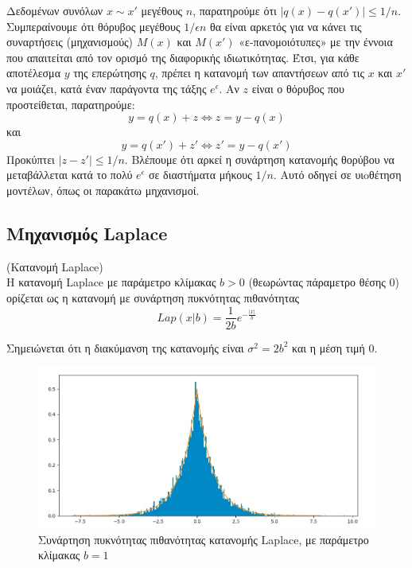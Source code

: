 Δεδομένων συνόλων $x\sim x'$ μεγέθους $n$, παρατηρούμε ότι $|q(x)-q(x')|\leq 1/n$. Συμπεραίνουμε ότι θόρυβος μεγέθους $1/\epsilon n$ θα είναι αρκετός για να κάνει τις συναρτήσεις (μηχανισμούς) $M(x)$ και $M(x')$ «ε-πανομοιότυπες» με την έννοια που απαιτείται από τον ορισμό της διαφορικής ιδιωτικότητας. Έτσι, για κάθε αποτέλεσμα $y$ της επερώτησης $q$, πρέπει η κατανομή των απαντήσεων από τις $x$ και $x'$ να μοιάζει, κατά έναν παράγοντα της τάξης $e^\epsilon$. Αν $z$ είναι ο θόρυβος που προστείθεται, παρατηρούμε:
$$y=q(x)+z \Longleftrightarrow z=y-q(x)$$ και
$$y=q(x')+z' \Longleftrightarrow z'=y-q(x')$$
Προκύπτει $|z-z'|\leq 1/n$. Βλέπουμε ότι αρκεί η συνάρτηση κατανομής θορύβου να μεταβάλλεται κατά το πολύ $e^\epsilon$ σε διαστήματα μήκους $1/n$. Αυτό οδηγεί σε υιoθέτηση μοντέλων, όπως οι παρακάτω μηχανισμοί.


\subsection{Μηχανισμός \textlatin{Laplace}}
\begin{definition}(Κατανομή \textlatin{Laplace})\\
H κατανομή \textlatin{Laplace} με παράμετρο κλίμακας $b>0$ (θεωρώντας πάραμετρο θέσης 0) ορίζεται ως η κατανομή με συνάρτηση πυκνότητας πιθανότητας 
$$Lap(x|b)=\frac{1}{2b}e^{-\frac{|x|}{b}}$$
\end{definition}
Σημειώνεται ότι η διακύμανση της κατανομής είναι $\sigma^2=2b^2$ και η μέση τιμή $0$.

\begin{figure} [ht]
\begin{center}
  \includegraphics[scale=0.42]{images/Laplace1.jpg}
  \caption{Συνάρτηση πυκνότητας πιθανότητας κατανομής \textlatin{Laplace}, με παράμετρο κλίμακας $b=1$
}
  \end{center}
\end{figure}


